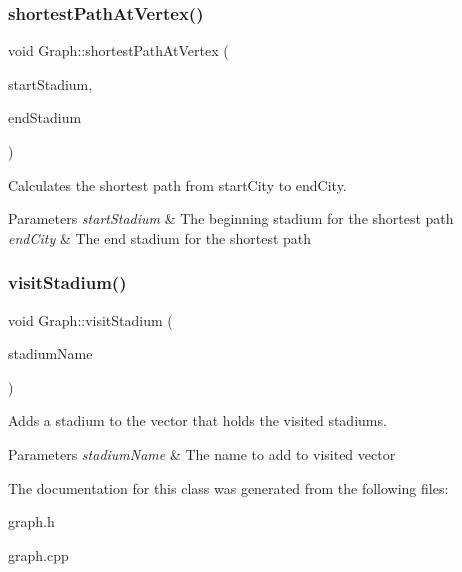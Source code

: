 \subsubsection{\texorpdfstring{shortest\+Path\+At\+Vertex()}{shortestPathAtVertex()}}
{\footnotesize\ttfamily void Graph\+::shortest\+Path\+At\+Vertex (\begin{DoxyParamCaption}\item[{Q\+String}]{start\+Stadium,  }\item[{Q\+String}]{end\+Stadium }\end{DoxyParamCaption})}



Calculates the shortest path from start\+City to end\+City. 


\begin{DoxyParams}{Parameters}
{\em start\+Stadium} & The beginning stadium for the shortest path \\
\hline
{\em end\+City} & The end stadium for the shortest path \\
\hline
\end{DoxyParams}
\mbox{\label{class_graph_aaeaed59906eb9fbacb946b053ab5a9e0}} 
\subsubsection{\texorpdfstring{visit\+Stadium()}{visitStadium()}}
{\footnotesize\ttfamily void Graph\+::visit\+Stadium (\begin{DoxyParamCaption}\item[{Q\+String}]{stadium\+Name }\end{DoxyParamCaption})}



Adds a stadium to the vector that holds the visited stadiums. 


\begin{DoxyParams}{Parameters}
{\em stadium\+Name} & The name to add to visited vector \\
\hline
\end{DoxyParams}


The documentation for this class was generated from the following files\+:\begin{DoxyCompactItemize}
\item 
graph.\+h\item 
graph.\+cpp\end{DoxyCompactItemize}
